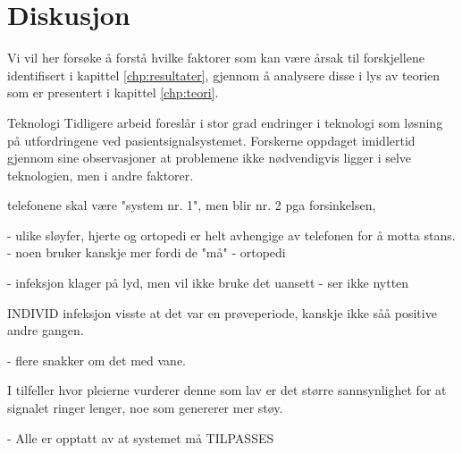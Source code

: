 \chapter{Diskusjon}
\label{chp:diskusjon}

Vi vil her forsøke å forstå hvilke faktorer som kan være årsak til forskjellene identifisert i kapittel \ref{chp:resultater}, gjennom å analysere disse i lys av teorien som er presentert i kapittel \ref{chp:teori}. 



Teknologi
Tidligere arbeid foreslår i stor grad endringer i teknologi som løsning på utfordringene ved pasientsignalsystemet. Forskerne oppdaget imidlertid gjennom sine observasjoner at problemene ikke nødvendigvis ligger i selve teknologien, men i andre faktorer.

 telefonene skal være "system nr. 1", men blir nr. 2 pga forsinkelsen,
 
 
 - ulike sløyfer, hjerte og ortopedi er helt avhengige av telefonen for å motta stans.	
	- noen bruker kanskje mer fordi de "må" - ortopedi
	
- infeksjon klager på lyd, men vil ikke bruke det uansett
	- ser ikke nytten
	
	
	
INDIVID
infeksjon visste at det var en prøveperiode, kanskje ikke såå positive andre gangen.

- flere snakker om det med vane.


I tilfeller hvor pleierne vurderer denne som lav er det større sannsynlighet for at signalet ringer lenger, noe som genererer mer støy.

- Alle er opptatt av at systemet må TILPASSES